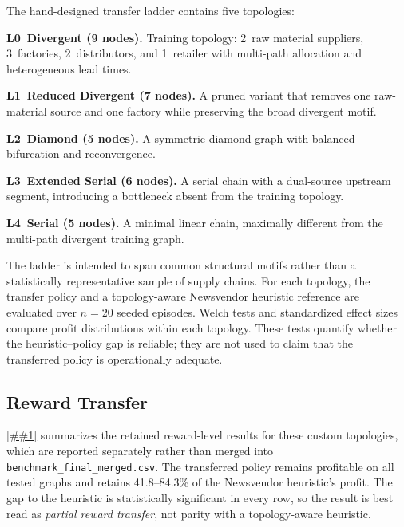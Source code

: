 \documentclass[10pt,a4paper]{article}
\providecommand{\Cref}[1]{\ref{##1}}
\let\origenumerate\enumerate
\let\endorigenumerate\endenumerate
\renewenvironment{enumerate}[1][]{\origenumerate}{\endorigenumerate}
\begin{document}
The hand-designed transfer ladder contains five topologies:
\begin{enumerate}[itemsep=2pt]
  \item \textbf{L0~Divergent (9 nodes).}  Training topology:
    2~raw material suppliers, 3~factories, 2~distributors, and
    1~retailer with multi-path allocation and heterogeneous lead times.
  \item \textbf{L1~Reduced Divergent (7 nodes).}  A pruned variant
    that removes one raw-material source and one factory while
    preserving the broad divergent motif.
  \item \textbf{L2~Diamond (5 nodes).}  A symmetric diamond graph with
    balanced bifurcation and reconvergence.
  \item \textbf{L3~Extended Serial (6 nodes).}  A serial chain with a
    dual-source upstream segment, introducing a bottleneck absent from
    the training topology.
  \item \textbf{L4~Serial (5 nodes).}  A minimal linear chain, maximally
    different from the multi-path divergent training graph.
\end{enumerate}

The ladder is intended to span common structural motifs rather than a
statistically representative sample of supply chains.  For each
topology, the transfer policy and a topology-aware Newsvendor heuristic
reference are evaluated over $n=20$ seeded episodes.  Welch tests and
standardized effect sizes compare profit distributions within each
topology.  These tests quantify whether the heuristic--policy gap is
reliable; they are not used to claim that the transferred policy is
operationally adequate.

\subsection{Reward Transfer}

\Cref{tab:transfer_full} summarizes the retained reward-level results
for these custom topologies, which are reported separately rather than
merged into \texttt{benchmark\_final\_merged.csv}.  The transferred
policy remains profitable on all tested graphs and retains
41.8--84.3\% of the Newsvendor heuristic's profit.  The gap to the
heuristic is statistically significant in every row, so the result is
best read as \emph{partial reward transfer}, not parity with a
topology-aware heuristic.
\end{document}
